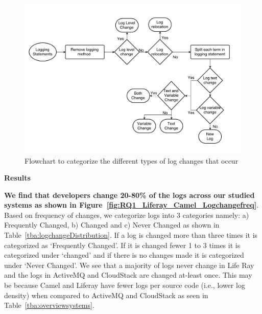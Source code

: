 \begin{figure}[tb]
	\centering
	\includegraphics[width=0.75\linewidth]{Flowchart2}
	\caption{Flowchart to categorize the different types of log changes that occur}
	\label{fig:Flowchart2}
\end{figure}



\noindent \textbf{Results}

\textbf{We find that developers change 20-80\% of the logs across our studied systems as shown in Figure~\ref{fig:RQ1_Liferay_Camel_Logchangefreq}}. Based on frequency of changes, we categorize logs into 3 categories namely: a) Frequently Changed, b) Changed and c) Never Changed as shown in Table~\ref{tba:logchangeDistribution}. If a log is changed more than three times it is categorized as `Frequently Changed'. If it is changed fewer 1 to 3 times it is categorized under `changed' and if there is no changes made it is categorized under `Never Changed'. We see that a majority of logs never change in Life Ray and the logs in ActiveMQ and CloudStack are changed at-least once. This may be because Camel and Liferay have fewer logs per source code (i.e., lower log density) when compared to ActiveMQ and CloudStack as seen in Table~\ref{tba:overviewsystems}. 



